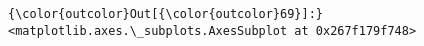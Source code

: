 \documentclass[11pt]{article}
\begin{document}
            \begin{Verbatim}[commandchars=\\\{\}]
{\color{outcolor}Out[{\color{outcolor}69}]:} <matplotlib.axes.\_subplots.AxesSubplot at 0x267f179f748>
\end{Verbatim}
        
    \begin{center}
    \end{center}
    { \hspace*{\fill} \\}
    
    \begin{center}
    \end{center}
    { \hspace*{\fill} \\}
    
\end{document}
